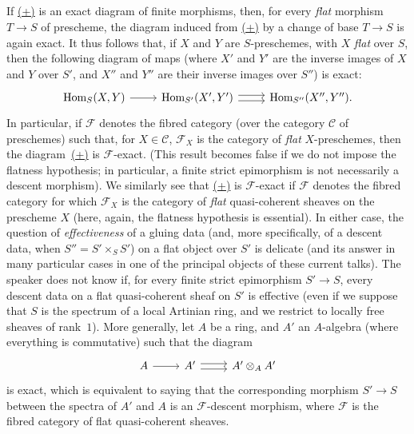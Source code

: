 \documentclass{article}
\renewcommand{\cal}[1]{{\mathcal{#1}}}
\DeclareMathOperator{\Hom}{Hom}
\newcommand{\oldpage}[1]{\marginpar{\footnotesize$\Big\vert$ \textit{p.~#1}}}
\begin{document}
\subsection{}
\label{A.2.c}

If \hyperref[equation-example:A.2.b]{(+)} is an exact diagram of finite morphisms, then, for every \emph{flat} morphism $T\to S$ of prescheme, the diagram induced from \hyperref[equation-example:A.2.b]{(+)} by a change of base $T\to S$ is again exact.
It thus follows that, if $X$ and $Y$ are $S$-preschemes, with $X$ \emph{flat} over $S$, then the following diagram of maps (where $X'$ and $Y'$ are the inverse images of $X$ and $Y$ over $S'$, and $X''$ and $Y''$ are their inverse images over $S''$) is exact:
\[
  \begin{tikzcd}
    \Hom_S(X,Y) \rar
    & \Hom_{S'}(X',Y') \rar[shift left=1] \rar[shift right=1]
    & \Hom_{S''}(X'',Y'').
  \end{tikzcd}
\]
In particular, if $\cal{F}$ denotes the fibred category (over the category $\cal{C}$ of preschemes) such that, for $X\in\cal{C}$, $\cal{F}_X$ is the category of \emph{flat} $X$-preschemes, then the diagram~\hyperref[equation-example:A.2.b]{(+)} is $\cal{F}$-exact.
(This result becomes false if we do not impose the flatness hypothesis; in particular, a finite strict epimorphism is not necessarily a descent morphism).
We similarly see that \hyperref[equation-example:A.2.b]{(+)} is $\cal{F}$-exact if $\cal{F}$ denotes the fibred category for which $\cal{F}_X$ is the category of \emph{flat} quasi-coherent sheaves on the prescheme $X$ (here, again, the
\oldpage{190-09}
flatness hypothesis is essential).
In either case, the question of \emph{effectiveness} of a gluing data (and, more specifically, of a descent data, when $S''=S'\times_S S'$) on a flat object over $S'$ is delicate (and its answer in many particular cases in one of the principal objects of these current talks).
The speaker does not know if, for every finite strict epimorphism $S'\to S$, every descent data on a flat quasi-coherent sheaf on $S'$ is effective (even if we suppose that $S$ is the spectrum of a local Artinian ring, and we restrict to locally free sheaves of rank~$1$).
More generally, let $A$ be a ring, and $A'$ an $A$-algebra (where everything is commutative) such that the diagram
\[
  \begin{tikzcd}
    A \rar
    & A' \rar[shift left=1] \rar[shift right=1]
    & A'\otimes_A A'
  \end{tikzcd}
\]
is exact, which is equivalent to saying that the corresponding morphism $S'\to S$ between the spectra of $A'$ and $A$ is an $\cal{F}$-descent morphism, where $\cal{F}$ is the fibred category of flat quasi-coherent sheaves.
\end{document}
